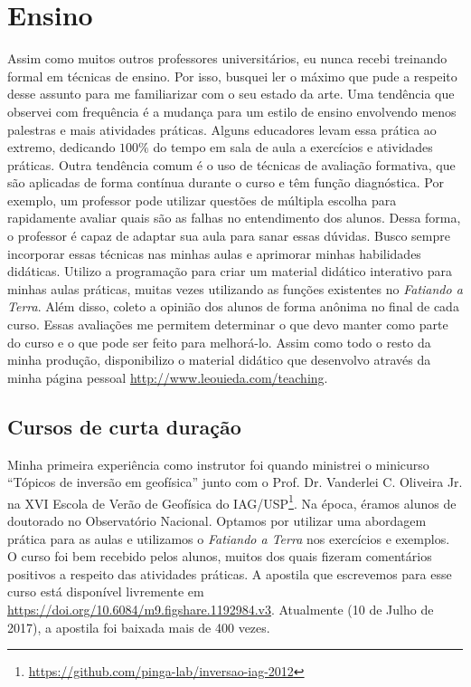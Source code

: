 \section{Ensino}

Assim como muitos outros professores universitários, eu nunca recebi treinando
formal em técnicas de ensino.
Por isso, busquei ler o máximo que pude a respeito desse assunto para me
familiarizar com o seu estado da arte.
Uma tendência que observei com frequência é a mudança para um estilo de ensino
envolvendo menos palestras e mais atividades práticas.
Alguns educadores levam essa prática ao extremo, dedicando $100\%$ do tempo em
sala de aula a exercícios e atividades práticas.
Outra tendência comum é o uso de técnicas de avaliação formativa, que são
aplicadas de forma contínua durante o curso e têm função diagnóstica.
Por exemplo, um professor pode utilizar questões de múltipla escolha para
rapidamente avaliar quais são as falhas no entendimento dos alunos.
Dessa forma, o professor é capaz de adaptar sua aula para sanar essas dúvidas.
Busco sempre incorporar essas técnicas nas minhas aulas e aprimorar minhas
habilidades didáticas.
Utilizo a programação para criar um material didático interativo para minhas
aulas práticas, muitas vezes utilizando as funções existentes no
\textit{Fatiando a Terra}.
Além disso, coleto a opinião dos alunos de forma anônima no final de cada
curso.
Essas avaliações me permitem determinar o que devo manter como parte do curso e
o que pode ser feito para melhorá-lo.
Assim como todo o resto da minha produção, disponibilizo o material didático
que desenvolvo através da minha página pessoal
\url{http://www.leouieda.com/teaching}.


\subsection{Cursos de curta duração}

Minha primeira experiência como instrutor foi quando ministrei o minicurso
``Tópicos de inversão em geofísica'' junto com o Prof. Dr. Vanderlei C.
Oliveira Jr. na XVI Escola de Verão de Geofísica do
IAG/USP\footnote{\url{https://github.com/pinga-lab/inversao-iag-2012}}.
Na época, éramos alunos de doutorado no Observatório Nacional.
Optamos por utilizar uma abordagem prática para as aulas e utilizamos o
\textit{Fatiando a Terra} nos exercícios e exemplos.
O curso foi bem recebido pelos alunos, muitos dos quais fizeram comentários
positivos a respeito das atividades práticas.
A apostila que escrevemos para esse curso está disponível livremente em
\url{https://doi.org/10.6084/m9.figshare.1192984.v3}.
Atualmente (10 de Julho de 2017), a apostila foi baixada mais de 400 vezes.

